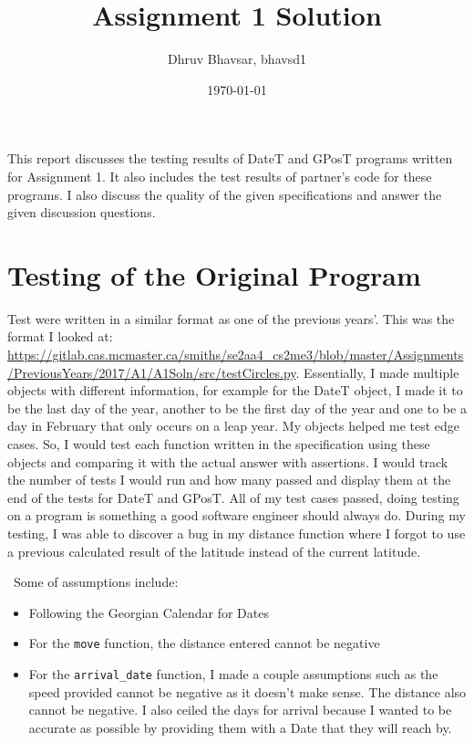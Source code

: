 \documentclass[12pt]{article}
\title{Assignment 1 Solution}
\author{Dhruv Bhavsar, bhavsd1}
\date{\today}
\begin{document}
\maketitle

This report discusses the testing results of DateT and GPosT programs written for Assignment 1. It also includes the test results of partner's code for these programs. I also discuss the quality of the given specifications and answer the given discussion questions.

\section{Testing of the Original Program}

Test were written in a similar format as one of the previous years'. This was the format I looked at: \url{https://gitlab.cas.mcmaster.ca/smiths/se2aa4_cs2me3/blob/master/Assignments/PreviousYears/2017/A1/A1Soln/src/testCircles.py}. Essentially, I made multiple objects with different information, for example for the DateT object, I made it to be the last day of the year, another to be the first day of the year and one to be a day in February that only occurs on a leap year. My objects helped me test edge cases. So, I would test each function written in the specification using these objects and comparing it with the actual answer with assertions. I would track the number of tests I would run and how many passed and display them at the end of the tests for DateT and GPosT. All of my test cases passed, doing testing on a program is something a good software engineer should always do. During my testing, I was able to discover a bug in my distance function where I forgot to use a previous calculated result of the latitude instead of the current latitude.


~\newline\noindent Some of assumptions include:
\begin{itemize}
	\item Following the Georgian Calendar for Dates
	\item For the \texttt{move} function, the distance entered cannot be negative
	\item For the \texttt{arrival\_date} function, I made a couple assumptions such as the speed provided cannot be negative as it doesn't make sense. The distance also cannot be negative. I also ceiled the days for arrival because I wanted to be accurate as possible by providing them with a Date that they will reach by.
	
\end{itemize}
\end{document}
